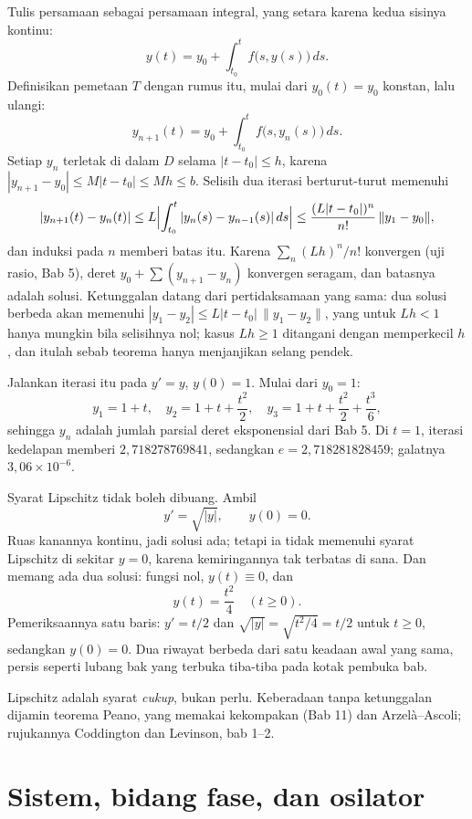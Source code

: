 Tulis persamaan sebagai persamaan integral, yang setara karena kedua sisinya
kontinu:
\[
y(t)=y_{0}+\int_{t_{0}}^{t}f\bigl(s,y(s)\bigr)\,ds .
\]
Definisikan pemetaan $T$ dengan rumus itu, mulai dari $y_{0}(t)=y_{0}$ konstan,
lalu ulangi:
\[
y_{n+1}(t)=y_{0}+\int_{t_{0}}^{t}f\bigl(s,y_{n}(s)\bigr)\,ds .
\]
Setiap $y_{n}$ terletak di dalam $D$ selama $|t-t_{0}|\le h$, karena
$|y_{n+1}-y_{0}|\le M|t-t_{0}|\le Mh\le b$. Selisih dua iterasi berturut-turut
memenuhi
\[
|y_{n+1}(t)-y_{n}(t)|\le L\Bigl|\int_{t_{0}}^{t}|y_{n}(s)-y_{n-1}(s)|\,ds\Bigr|
\le \frac{(L|t-t_{0}|)^{n}}{n!}\,\|y_{1}-y_{0}\| ,
\]
dan induksi pada $n$ memberi batas itu. Karena $\sum_{n}(Lh)^{n}/n!$ konvergen
(uji rasio, Bab 5), deret $y_{0}+\sum(y_{n+1}-y_{n})$ konvergen seragam, dan
batasnya adalah solusi. Ketunggalan datang dari pertidaksamaan yang sama: dua
solusi berbeda akan memenuhi $|y_{1}-y_{2}|\le L|t-t_{0}|\,\|y_{1}-y_{2}\|$,
yang untuk $Lh<1$ hanya mungkin bila selisihnya nol; kasus $Lh\ge1$ ditangani
dengan memperkecil $h$, dan itulah sebab teorema hanya menjanjikan selang
pendek.

Jalankan iterasi itu pada $y'=y$, $y(0)=1$. Mulai dari $y_{0}=1$:
\[
y_{1}=1+t,\quad y_{2}=1+t+\frac{t^{2}}{2},\quad
y_{3}=1+t+\frac{t^{2}}{2}+\frac{t^{3}}{6},
\]
sehingga $y_{n}$ adalah jumlah parsial deret eksponensial dari Bab 5. Di $t=1$,
iterasi kedelapan memberi $2{,}718278769841$, sedangkan $e=2{,}718281828459$;
galatnya $3{,}06\times10^{-6}$.

Syarat Lipschitz tidak boleh dibuang. Ambil
\[
y'=\sqrt{|y|},\qquad y(0)=0 .
\]
Ruas kanannya kontinu, jadi solusi ada; tetapi ia tidak memenuhi syarat Lipschitz
di sekitar $y=0$, karena kemiringannya tak terbatas di sana. Dan memang ada dua
solusi: fungsi nol, $y(t)\equiv0$, dan
\[
y(t)=\frac{t^{2}}{4}\quad (t\ge0).
\]
Pemeriksaannya satu baris: $y'=t/2$ dan $\sqrt{|y|}=\sqrt{t^{2}/4}=t/2$ untuk
$t\ge0$, sedangkan $y(0)=0$. Dua riwayat berbeda dari satu keadaan awal yang
sama, persis seperti lubang bak yang terbuka tiba-tiba pada kotak pembuka bab.

Lipschitz adalah syarat \emph{cukup}, bukan perlu. Keberadaan tanpa
ketunggalan dijamin teorema Peano, yang memakai kekompakan (Bab 11) dan
Arzel\`a--Ascoli; rujukannya Coddington dan Levinson, bab 1--2.

\section{Sistem, bidang fase, dan osilator}

